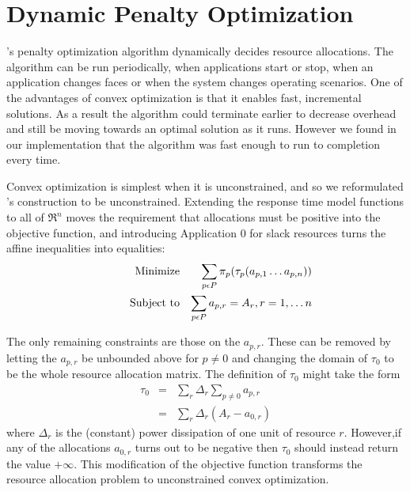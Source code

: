\section{Dynamic Penalty Optimization}\label{dyn_opt}


\pacora's penalty optimization algorithm dynamically decides resource allocations. The algorithm can be run periodically, when applications start or stop, when an application changes faces or when the system changes operating scenarios.  One of the advantages of convex optimization is that it enables fast, incremental solutions.  As a result the algorithm could terminate earlier to decrease overhead and still be moving towards an optimal solution as it runs.  However we found in our implementation that the algorithm was fast enough to run to completion every time. 

Convex optimization is simplest when it is unconstrained, and so we reformulated \pacora's construction to be unconstrained.
Extending the response time model functions to all of $\Re^n$
moves the requirement that allocations must be positive into the objective function,
and introducing Application 0 for slack resources turns the affine inequalities into equalities:
\begin{eqnarray*}
& \makebox[1in][r]{Minimize}   & \sum_{p\epsilon P} {\pi_p(\tau_p(a_{p,1}\ldots a_{p,n}))}  \\
& \makebox[1in][r]{Subject to} & \sum_{p\epsilon P} a_{p,r} = A_r, r = 1,\ldots n           \\
\end{eqnarray*}

The only remaining constraints are those on the $a_{p,r}$.
These can be removed by letting the $a_{p,r}$ be unbounded above for $p \neq 0$
and changing the domain of $\tau_0$  to be the whole resource allocation matrix.
The definition of $\tau_0$ might take the form
\begin{eqnarray*}
\tau_0 &=& \sum_r \Delta_r \sum_{p \neq 0} a_{p,r}     \\
       &=& \sum_r \Delta_r (A_r - a_{0,r})
\end{eqnarray*}
where $\Delta_r$ is the (constant) power dissipation of one unit of resource $r$.
However,if any of the allocations $a_{0,r}$ turns out to be negative then $\tau_0$  should instead return the value $+\infty$.
This modification of the objective function transforms the resource allocation problem
to unconstrained convex optimization.  


